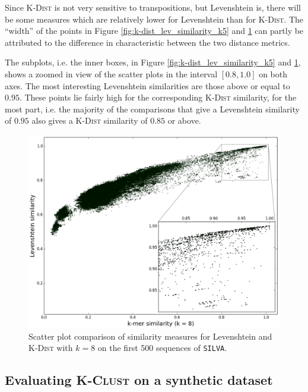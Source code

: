 Since \textsc{K-Dist} is not very sensitive to transpositions, but Levenshtein
is, there will be some measures which are relatively lower for Levenshtein
than for \textsc{K-Dist}. The ``width'' of the points in Figure
\ref{fig:k-dist_lev_similarity_k5} and \ref{fig:k-dist_lev_similarity_k8} can
partly be attributed to the difference in characteristic between the two
distance metrics.

The subplots, i.e. the inner boxes, in Figure
\ref{fig:k-dist_lev_similarity_k5} and \ref{fig:k-dist_lev_similarity_k8},
shows a zoomed in view of the scatter plots in the interval $[0.8,1.0]$ on both
axes. The most interesting Levenshtein similarities are those above or equal to
$0.95$. These points lie fairly high for the corresponding \textsc{K-Dist}
similarity, for the most part, i.e. the majority of the comparisons that give a
Levenshtein similarity of $0.95$ also gives a \textsc{K-Dist} similarity of
$0.85$ or above.

\begin{figure}[h!]
  \includegraphics[width=1.0\textwidth]{graphics/Levenshtein_K-Dist_k8.png}
  \caption{Scatter plot comparison of similarity measures for Levenshtein and
    \textsc{K-Dist} with $k=8$ on the first 500 sequences of \texttt{SILVA}.}
  \label{fig:k-dist_lev_similarity_k8}
\end{figure}


\subsection{Evaluating \textsc{K-Clust} on a synthetic dataset}
\label{sec:synth_dataset}

